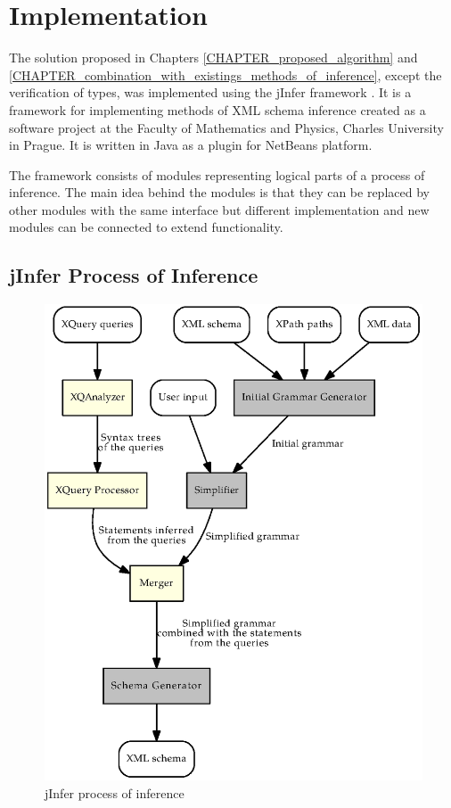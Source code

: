 \chapter{Implementation}
The solution proposed in Chapters \ref{CHAPTER_proposed_algorithm} and \ref{CHAPTER_combination_with_existings_methods_of_inference}, except the verification of types, was implemented using the jInfer framework \cite{jinfer}. It is a framework for implementing methods of XML schema inference created as a software project at the Faculty of Mathematics and Physics, Charles University in Prague. It is written in Java as a plugin for NetBeans platform.

The framework consists of modules representing logical parts of a process of inference. The main idea behind the modules is that they can be replaced by other modules with the same interface but different implementation and new modules can be connected to extend functionality.

\section{jInfer Process of Inference}
\begin{figure}
\includegraphics[scale=0.9]{jinfer_steps.eps}
\caption{jInfer process of inference}
\label{FIG_jinfer_steps}
\end{figure}

